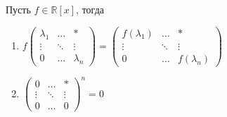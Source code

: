 \begin{claim*}
Пусть $f\in\mathbb R[x]$, тогда
\begin{enumerate}
\item 
$
f
\begin{pmatrix}
{\lambda_1}&{\ldots}&{*}\\
{\vdots}&{\ddots}&{\vdots}\\
{0}&{\ldots}&{\lambda_n}
\end{pmatrix}
=
\begin{pmatrix}
{f(\lambda_1)}&{\ldots}&{*}\\
{\vdots}&{\ddots}&{\vdots}\\
{0}&{\ldots}&{f(\lambda_n)}
\end{pmatrix}
$

\item
$
\begin{pmatrix}
{0}&{\ldots}&{*}\\
{\vdots}&{\ddots}&{\vdots}\\
{0}&{\ldots}&{0}
\end{pmatrix}^n = 0
$
\end{enumerate}
\end{claim*}

